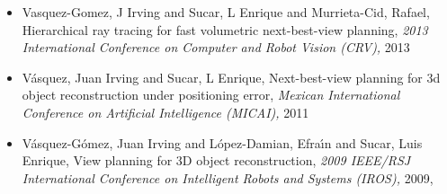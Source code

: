 \begin{itemize}
\item Vasquez-Gomez, J Irving and Sucar, L Enrique and Murrieta-Cid, Rafael, Hierarchical ray tracing for fast volumetric next-best-view planning, \textit{ 2013 International Conference on Computer and Robot Vision (CRV),} 2013 
\item V{\'a}squez, Juan Irving and Sucar, L Enrique, Next-best-view planning for 3d object reconstruction under positioning error, \textit{ Mexican International Conference on Artificial Intelligence (MICAI),} 2011 
\item V{\'a}squez-G{\'o}mez, Juan Irving and L{\'o}pez-Damian, Efra{\'\i}n and Sucar, Luis Enrique, View planning for 3D object reconstruction, \textit{ 2009 IEEE/RSJ International Conference on Intelligent Robots and Systems (IROS),} 2009, \href{https://doi.org/10.1109/IROS.2009.5354383} {\faFilePdfO} 
\end{itemize} 
